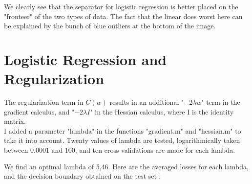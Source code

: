 \documentclass[a4paper, 12pt]{article}
\begin{document}
\medskip
We clearly see that the separator for logistic regression is better placed on the "fronteer" of the two types of data. The fact that the linear does worst here can be explained by the bunch of blue outliers at the bottom of the image.

\section{Logistic Regression and Regularization}

The regularization term in $C(w)$ results in an additional "$-2\lambda w$" term in the gradient calculus, and "$-2\lambda I$" in the Hessian calculus, where I is the identity matrix.
\\I added a parameter "lambda" in the functions "gradient.m" and "hessian.m" to take it into account. Twenty values of lambda are tested, logarithmically taken between 0.0001 and 100,  and ten cross-validations are made for each lambda.

We find an optimal lambda of 5,46. Here are the averaged losses for each lambda, and the decision boundary obtained on the test set :
\end{document}
